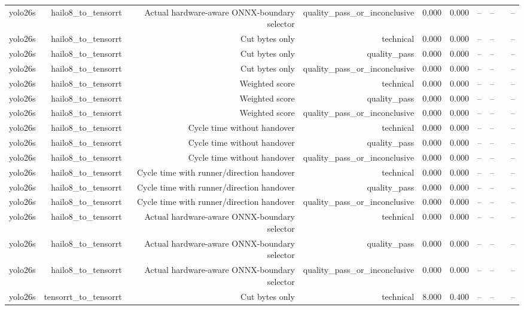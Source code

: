 \begin{table}[t]
\begin{tabular}{lrrrrrrrrr}
yolo26s & hailo8\_to\_tensorrt & Actual hardware-aware ONNX-boundary selector & quality\_pass\_or\_inconclusive & 0.000 & 0.000 & -- & -- &  & -- \\
yolo26s & hailo8\_to\_tensorrt & Cut bytes only & technical & 0.000 & 0.000 & -- & -- &  & -- \\
yolo26s & hailo8\_to\_tensorrt & Cut bytes only & quality\_pass & 0.000 & 0.000 & -- & -- &  & -- \\
yolo26s & hailo8\_to\_tensorrt & Cut bytes only & quality\_pass\_or\_inconclusive & 0.000 & 0.000 & -- & -- &  & -- \\
yolo26s & hailo8\_to\_tensorrt & Weighted score & technical & 0.000 & 0.000 & -- & -- &  & -- \\
yolo26s & hailo8\_to\_tensorrt & Weighted score & quality\_pass & 0.000 & 0.000 & -- & -- &  & -- \\
yolo26s & hailo8\_to\_tensorrt & Weighted score & quality\_pass\_or\_inconclusive & 0.000 & 0.000 & -- & -- &  & -- \\
yolo26s & hailo8\_to\_tensorrt & Cycle time without handover & technical & 0.000 & 0.000 & -- & -- &  & -- \\
yolo26s & hailo8\_to\_tensorrt & Cycle time without handover & quality\_pass & 0.000 & 0.000 & -- & -- &  & -- \\
yolo26s & hailo8\_to\_tensorrt & Cycle time without handover & quality\_pass\_or\_inconclusive & 0.000 & 0.000 & -- & -- &  & -- \\
yolo26s & hailo8\_to\_tensorrt & Cycle time with runner/direction handover & technical & 0.000 & 0.000 & -- & -- &  & -- \\
yolo26s & hailo8\_to\_tensorrt & Cycle time with runner/direction handover & quality\_pass & 0.000 & 0.000 & -- & -- &  & -- \\
yolo26s & hailo8\_to\_tensorrt & Cycle time with runner/direction handover & quality\_pass\_or\_inconclusive & 0.000 & 0.000 & -- & -- &  & -- \\
yolo26s & hailo8\_to\_tensorrt & Actual hardware-aware ONNX-boundary selector & technical & 0.000 & 0.000 & -- & -- &  & -- \\
yolo26s & hailo8\_to\_tensorrt & Actual hardware-aware ONNX-boundary selector & quality\_pass & 0.000 & 0.000 & -- & -- &  & -- \\
yolo26s & hailo8\_to\_tensorrt & Actual hardware-aware ONNX-boundary selector & quality\_pass\_or\_inconclusive & 0.000 & 0.000 & -- & -- &  & -- \\
yolo26s & tensorrt\_to\_tensorrt & Cut bytes only & technical & 8.000 & 0.400 & -- & -- &  & -- \\

\end{tabular}
\end{table}
